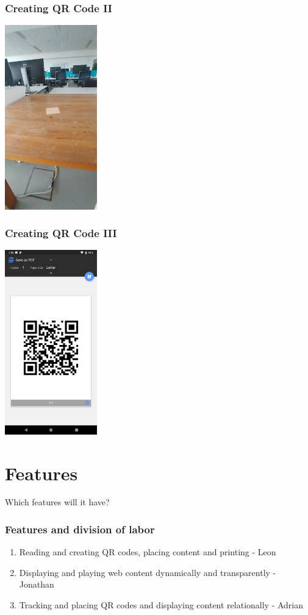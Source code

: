 \documentclass{beamer}
\begin{document}
\begin{frame}
  \frametitle{Creating QR Code II}
  \includegraphics[height=8cm]{spanned}
\end{frame}

\begin{frame}
  \frametitle{Creating QR Code III}
  \includegraphics[height=8cm]{printing.png}
\end{frame}

\section{Features}
\begin{frame}
	\begin{center}
		{\Huge Which features will it have?}
	\end{center}
\end{frame}
\begin{frame}
  \frametitle{Features and division of labor}
  \begin{enumerate}
    \item Reading and creating QR codes, placing content and printing - Leon
    \item Displaying and playing web content dynamically and transparently - Jonathan
    \item Tracking and placing QR codes and displaying content relationally - Adrian
  \end{enumerate}
\end{frame}
\end{document}
